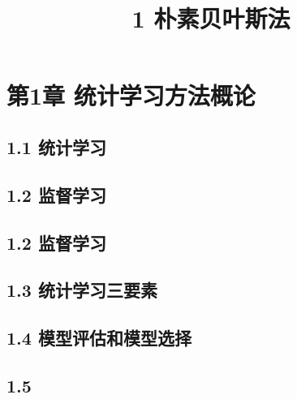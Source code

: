 \documentclass{article}
\begin{document}
\title{1 朴素贝叶斯法}
\date{}
\maketitle
\tableofcontents
\else
\chapter*{第1章 统计学习方法概论}
\fi
\section*{1.1 统计学习}

\section*{1.2 监督学习}
\section*{1.2 监督学习}
\section*{1.3 统计学习三要素}
\section*{1.4 模型评估和模型选择}
\section*{1.5 }
\ifx\allfiles\undefined
\end{document}
